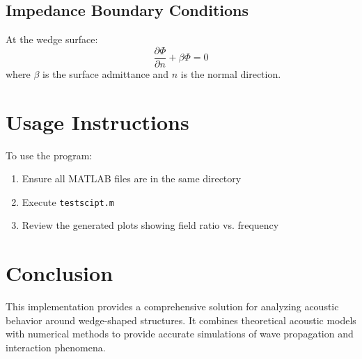 \documentclass[12pt,a4paper]{article}
\begin{document}
\subsection{Impedance Boundary Conditions}
At the wedge surface:
\begin{equation}
    \frac{\partial \Phi}{\partial n} + \beta\Phi = 0
\end{equation}
where $\beta$ is the surface admittance and $n$ is the normal direction.

\section{Usage Instructions}
To use the program:

\begin{enumerate}
    \item Ensure all MATLAB files are in the same directory
    \item Execute \texttt{testscipt.m}
    \item Review the generated plots showing field ratio vs. frequency
\end{enumerate}



\section{Conclusion}
This implementation provides a comprehensive solution for analyzing acoustic behavior around wedge-shaped structures. It combines theoretical acoustic models with numerical methods to provide accurate simulations of wave propagation and interaction phenomena.
\end{document}
